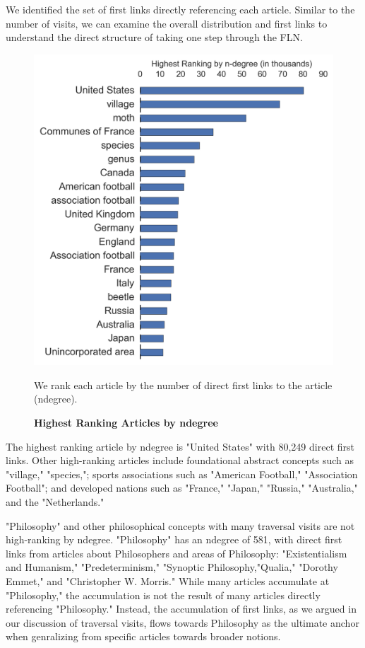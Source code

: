 \documentclass[pre,twocolumn,twoside,superscriptaddress,floatfix, aps, 10pt]{revtex4-1}
\begin{document}
We identified the set of first links directly referencing each article. 
Similar to the number of visits, we can examine the overall distribution and 
first links to understand the direct structure of taking one step through the 
FLN. 


\begin{figure}[tp!]
  \centering	
  \includegraphics[width=\columnwidth]{graphics/articles_ndegree.png}
  \caption{
    \textbf{Highest Ranking Articles by ndegree}
  }
  We rank each article by the number of direct first links to the article (ndegree). 
  \label{fig:ndegree list}

\end{figure}
The highest ranking article by ndegree is 
"United States" with 80,249 direct first links. Other high-ranking articles
include foundational abstract concepts such as "village," "species,"; 
sports associations such as "American Football," "Association Football"; 
and developed nations such as "France," "Japan," "Russia," "Australia," and 
the "Netherlands." 

"Philosophy" and other philosophical concepts with many traversal visits
are not high-ranking by ndegree.
"Philosophy" has an ndegree of 581, with direct first links from articles about Philosophers and areas of Philosophy: "Existentialism and Humanism," "Predeterminism," "Synoptic Philosophy,"Qualia," "Dorothy Emmet," and "Christopher W. Morris."
While many articles accumulate at "Philosophy," the accumulation is not the 
result of many articles directly referencing "Philosophy." 
Instead, the accumulation of first links, as we argued in our 
discussion of traversal visits, flows towards Philosophy as the 
ultimate anchor when genralizing from specific articles towards broader notions.
\end{document}
